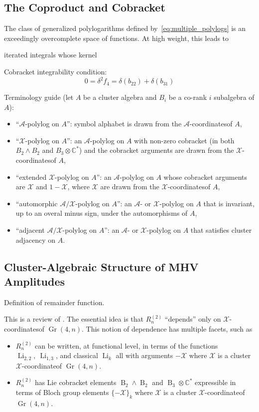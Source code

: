 \documentclass[11pt]{article}
\DeclareMathOperator{\B}{B}
\DeclareMathOperator{\Gr}{Gr}
\DeclareMathOperator{\Li}{Li}
\def\x{\mathcal{X}}
\def\xcoord{$\mathcal{X}$-coordinate}
\def\xcoords{$\mathcal{X}$-coordinates}
\def\a{\mathcal{A}}
\def\acoords{$\mathcal{A}$-coordinates}
\def\bb2{B_2\wedge B_2}
\def\b3c{B_3 \otimes \mathbb{C}^*}
\begin{document}
\subsection{The Coproduct and Cobracket} \label{sec:coproduct}

The class of generalized polylogarithms defined by~\eqref{eq:multiple_polylogs} is an exceedingly overcomplete space of functions. At high weight, this leads to 

 iterated integrals whose kernel  

Cobracket integrability condition:
\begin{equation} \label{eq:integrability}
	0 = \delta^2 f_4 = \delta(b_{22}) + \delta(b_{31})
\end{equation}



\newpage
Terminology guide (let $A$ be a cluster algebra and $B_i$ be a co-rank $i$ subalgebra of $A$):
\begin{itemize}
	\item ``$\a$-polylog on $A$'': symbol alphabet is drawn from the \acoords of $A$,
	\item ``$\x$-polylog on $A$'': an $\a$-polylog on $A$ with non-zero cobracket (in both $\bb2$ and $\b3c$) and the cobracket arguments are drawn from the \xcoords of $A$,
	\item ``extended $\x$-polylog on $A$'': an $\a$-polylog on $A$ whose cobracket arguments are $\x$ and $1-\x$, where $\x$ are drawn from the \xcoords of $A$,
	\item ``automorphic $\a/\x$-polylog on $A$'': an $\a$- or $\x$-polylog on $A$ that is invariant, up to an overal minus sign, under the automorphisms of $A$,
	\item ``adjacent $\a/\x$-polylog on $A$'': an $\a$- or $\x$-polylog on $A$ that satisfies cluster adjacency on $A$.
\end{itemize}



\subsection{Cluster-Algebraic Structure of MHV Amplitudes}\label{sec:cluster-algebra-R2n}

Definition of remainder function.

This is a review of \cite{Golden:2013xva,Golden:2014xqa,Golden:2014pua}. The essential idea is that $R^{(2)}_n$ ``depends'' only on \xcoords of $\Gr(4,n)$. This notion of dependence has multiple facets, such as 
\begin{itemize}
	\item $R^{(2)}_n$ can be written, at functional level, in terms of the functions $\Li_{2,2},~\Li_{1,3}$, and classical $\Li_k$ all with arguments $-\mathcal{X}$ where $\mathcal{X}$ is a cluster \xcoord of $\Gr(4,n)$.
	\item $R^{(2)}_n$ has Lie cobracket elements $\B_2 \wedge \B_2$ and $\B_3 \otimes \mathbb{C}^*$ expressible in terms of Bloch group elements $\{-\mathcal{X}\}_k$ where $\mathcal{X}$ is a cluster \xcoord of $\Gr(4,n)$. 
\end{itemize}
\end{document}
